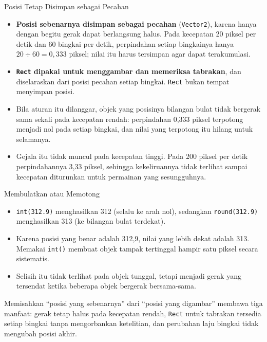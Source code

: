\documentclass[aspectratio=169,10pt]{beamer}
\begin{document}
\begin{frame}{Posisi Tetap Disimpan sebagai Pecahan}
\begin{itemize}
  \item \textbf{Posisi sebenarnya disimpan sebagai pecahan} (\texttt{Vector2}),
        karena hanya dengan begitu gerak dapat berlangsung halus. Pada kecepatan
        20 piksel per detik dan 60 bingkai per detik, perpindahan setiap
        bingkainya hanya $20 \div 60 = 0{,}333$ piksel; nilai itu harus
        tersimpan agar dapat terakumulasi.
  \item \textbf{\texttt{Rect} dipakai untuk menggambar dan memeriksa tabrakan},
        dan diselaraskan dari posisi pecahan setiap bingkai. \texttt{Rect} bukan
        tempat menyimpan posisi.
  \item Bila aturan itu dilanggar, objek yang posisinya bilangan bulat tidak
        bergerak sama sekali pada kecepatan rendah: perpindahan 0,333 piksel
        terpotong menjadi nol pada setiap bingkai, dan nilai yang terpotong itu
        hilang untuk selamanya.
  \item Gejala itu tidak muncul pada kecepatan tinggi. Pada 200 piksel per detik
        perpindahannya 3,33 piksel, sehingga kekeliruannya tidak terlihat sampai
        kecepatan diturunkan untuk permainan yang sesungguhnya.
\end{itemize}
\end{frame}

\begin{frame}{Membulatkan atau Memotong}
\begin{itemize}
  \item \texttt{int(312.9)} menghasilkan 312 (selalu ke arah nol), sedangkan
        \texttt{round(312.9)} menghasilkan 313 (ke bilangan bulat terdekat).
  \item Karena posisi yang benar adalah 312,9, nilai yang lebih dekat adalah
        313. Memakai \texttt{int()} membuat objek tampak tertinggal hampir satu
        piksel secara sistematis.
  \item Selisih itu tidak terlihat pada objek tunggal, tetapi menjadi gerak yang
        tersendat ketika beberapa objek bergerak bersama-sama.
\end{itemize}
\vspace{0.14cm}
\begin{kotak}
Memisahkan ``posisi yang sebenarnya'' dari ``posisi yang digambar'' membawa
tiga manfaat: gerak tetap halus pada kecepatan rendah, \texttt{Rect} untuk
tabrakan tersedia setiap bingkai tanpa mengorbankan ketelitian, dan perubahan
laju bingkai tidak mengubah posisi akhir.
\end{kotak}
\end{frame}
\end{document}
